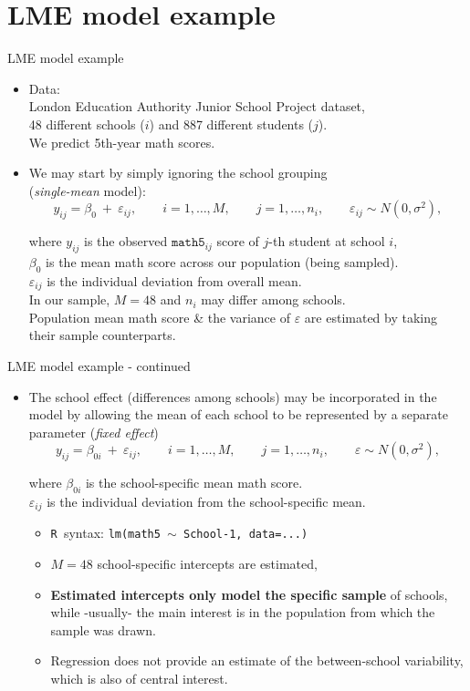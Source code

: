 \documentclass{beamer}
\newcommand{\Rko}{\texttt{R~}}
\begin{document}
\section{LME model example}
\begin{frame}{LME model example}
\begin{itemize}
\item Data: \\London Education Authority Junior School Project
dataset, \\48 different schools ($i$) and 887 different students ($j$). \\We predict 5th-year math scores.
\medskip
\item We may start by simply ignoring the school grouping \\(\textit{single-mean} model):
$$ y_{ij} = \beta_0~+~\varepsilon_{ij}, \qquad i=1,\dots,M, 
   \qquad j=1,\dots, n_i, \qquad \varepsilon_{ij} \sim N(0,\sigma^2), $$

where $y_{ij}$ is the observed $\texttt{math5}_{ij}$ score of $j$-th student at school $i$,\\
$\beta_0$ is the mean math score across our population (being sampled).\\
$\varepsilon_{ij}$ is the individual deviation from overall mean.\\
\medskip
In our sample, $M=48$ and $n_i$ may differ among schools.\\ 
\medskip
Population mean math score \& the variance of $\varepsilon$ are estimated by taking their sample counterparts.
\end{itemize}
\end{frame}
\begin{frame}{LME model example - continued}
\begin{itemize}
\item The school effect (differences among schools) may be incorporated in the model by allowing the mean of each school to be represented by a separate parameter (\textit{fixed effect})
$$ y_{ij} = \beta_{0i}~+~\varepsilon_{ij}, \qquad i=1,\dots,M, 
   \qquad j=1,\dots, n_i, \qquad \varepsilon \sim N(0,\sigma^2), $$

where $\beta_{0i}$ is the school-specific mean math score.\\
$\varepsilon_{ij}$ is the individual deviation from the school-specific mean.\\
\smallskip
\begin{itemize}
\item \Rko syntax: \texttt{lm(math5 $\sim$ School-1, data=...)}
\item $M=48$ school-specific intercepts are estimated,
\item \textbf{Estimated intercepts only model the specific sample}  of schools, while -usually- the main interest is in the population from which the sample was drawn.
\item Regression does not provide an estimate of the between-school variability, which is also of central interest.
\end{itemize}
\end{itemize}
\end{frame}
\end{document}
